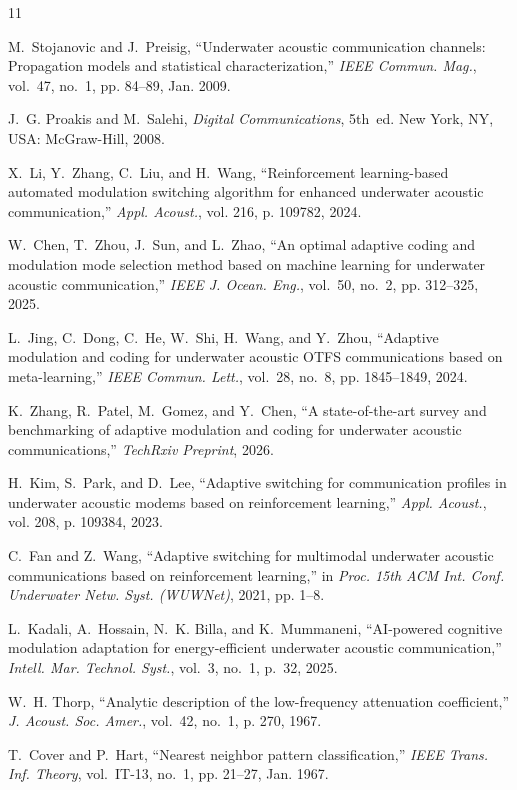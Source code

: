 \documentclass[conference]{IEEEtran}
\begin{document}
\begin{thebibliography}{11}

M.~Stojanovic and J.~Preisig, ``Underwater acoustic communication channels: Propagation models and statistical characterization,'' \emph{IEEE Commun. Mag.}, vol.~47, no.~1, pp. 84--89, Jan. 2009.

J.~G. Proakis and M.~Salehi, \emph{Digital Communications}, 5th~ed. New York, NY, USA: McGraw-Hill, 2008.

X.~Li, Y.~Zhang, C.~Liu, and H.~Wang, ``Reinforcement learning-based automated modulation switching algorithm for enhanced underwater acoustic communication,'' \emph{Appl. Acoust.}, vol. 216, p. 109782, 2024.

W.~Chen, T.~Zhou, J.~Sun, and L.~Zhao, ``An optimal adaptive coding and modulation mode selection method based on machine learning for underwater acoustic communication,'' \emph{IEEE J. Ocean. Eng.}, vol.~50, no.~2, pp. 312--325, 2025.

L.~Jing, C.~Dong, C.~He, W.~Shi, H.~Wang, and Y.~Zhou, ``Adaptive modulation and coding for underwater acoustic OTFS communications based on meta-learning,'' \emph{IEEE Commun. Lett.}, vol.~28, no.~8, pp. 1845--1849, 2024.

K.~Zhang, R.~Patel, M.~Gomez, and Y.~Chen, ``A state-of-the-art survey and benchmarking of adaptive modulation and coding for underwater acoustic communications,'' \emph{TechRxiv Preprint}, 2026.

H.~Kim, S.~Park, and D.~Lee, ``Adaptive switching for communication profiles in underwater acoustic modems based on reinforcement learning,'' \emph{Appl. Acoust.}, vol. 208, p. 109384, 2023.

C.~Fan and Z.~Wang, ``Adaptive switching for multimodal underwater acoustic communications based on reinforcement learning,'' in \emph{Proc. 15th ACM Int. Conf. Underwater Netw. Syst. (WUWNet)}, 2021, pp. 1--8.

L.~Kadali, A.~Hossain, N.~K. Billa, and K.~Mummaneni, ``AI-powered cognitive modulation adaptation for energy-efficient underwater acoustic communication,'' \emph{Intell. Mar. Technol. Syst.}, vol.~3, no.~1, p.~32, 2025.

W.~H. Thorp, ``Analytic description of the low-frequency attenuation coefficient,'' \emph{J. Acoust. Soc. Amer.}, vol.~42, no.~1, p. 270, 1967.

T.~Cover and P.~Hart, ``Nearest neighbor pattern classification,'' \emph{IEEE Trans. Inf. Theory}, vol.~IT-13, no.~1, pp. 21--27, Jan. 1967.

\end{thebibliography}
\end{document}
